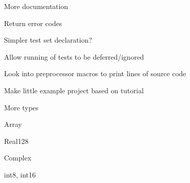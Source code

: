 
\begin{DoxyRefList}
\item[\label{todo__todo000001}%
\Hypertarget{todo__todo000001}%
Module \hyperlink{namespacefort__test}{fort\+\_\+test} ]
\begin{DoxyItemize}
\item More documentation
\item Return error codes
\item Simpler test set declaration?
\item Allow running of tests to be deferred/ignored
\item Look into preprocessor macros to print lines of source code
\item Make little example project based on tutorial
\item More types
\begin{DoxyItemize}
\item Array
\item Real128
\item Complex
\item int8, int16 
\end{DoxyItemize}
\end{DoxyItemize}
\end{DoxyRefList}